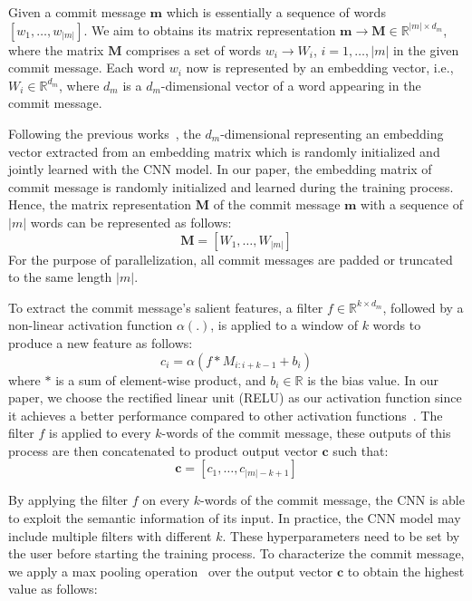 Given a commit message $\textbf{m}$ which is essentially a sequence of words $[w_1, \dots, w_{|m|}]$. We aim to obtains its matrix representation $\textbf{m} \rightarrow \textbf{M} \in \mathbb{R}^{|m| \times d_m}$, where the matrix $\textbf{M}$ comprises a set of words $w_i \rightarrow W_i$, $i = 1, \dots, |m|$ in the given commit message. Each word $w_i$ now is represented by an embedding vector, i.e., $W_i \in \mathbb{R}^{d_m}$, where $d_m$ is a $d_m$-dimensional vector of a word appearing in the commit message. 

Following the previous works~\cite{kim2014convolutional, zhang2015character}, the $d_m$-dimensional representing an embedding vector extracted from an embedding matrix which is randomly initialized and jointly learned with the CNN model. In our paper, the embedding matrix of commit message is randomly initialized and learned during the training process. Hence, the matrix representation $\textbf{M}$ of the commit message $\textbf{m}$ with a sequence of $|m|$ words can be represented as follows:
\begin{equation}
\label{eq:representation_msg}
    \textbf{M} = [W_1, \dots, W_{|m|}]
\end{equation}
For the purpose of parallelization, all commit messages are padded or truncated to the same length $|m|$. 

To extract the commit message's salient features, a filter $f \in \mathbb{R}^{k \times {d_m}}$, followed by a non-linear activation function $\alpha (.)$, is applied to a window of $k$ words to produce a new feature as follows:
\begin{equation}
\label{eq:filter_msg}
    c_i = \alpha(f * M_{i:i+k-1} + b_i)
\end{equation}
where $*$ is a sum of element-wise product, and $b_i \in \mathbb{R}$ is the bias value. In our paper, we choose the rectified linear unit (RELU) as our activation function since it achieves a better performance compared to other activation functions~\cite{nair2010rectified, dahl2013improving, he2016deep}. The filter $f$ is applied to every $k$-words of the commit message, these outputs of this process are then concatenated to product output vector $\textbf{c}$ such that:
\begin{equation}
\label{eq:output_ftr_msg}
\textbf{c} = [c_1, \dots, c_{|m| - k + 1}]
\end{equation}

By applying the filter $f$ on every $k$-words of the commit message, the CNN is able to exploit the semantic information of its input. In practice, the CNN model may include multiple filters with different $k$. These hyperparameters need to be set by the user before starting the training process. To characterize the commit message, we apply a max pooling operation~\cite{lecun2015deep} over the output vector $\textbf{c}$ to obtain the highest value as follows: 

